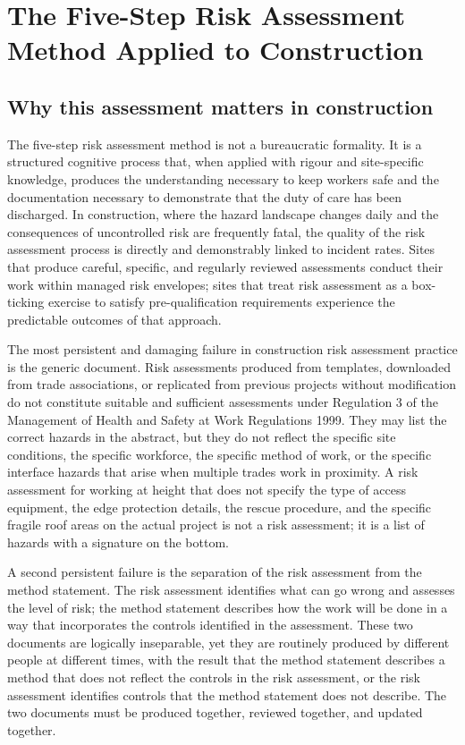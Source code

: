 \chapter{The Five-Step Risk Assessment Method Applied to Construction}
\label{chap:The Five-Step Risk Assessment Method Applied to Construction}

\section{Why this assessment matters in construction}

The five-step risk assessment method is not a bureaucratic formality. It is a structured cognitive process that, when applied with rigour and site-specific knowledge, produces the understanding necessary to keep workers safe and the documentation necessary to demonstrate that the duty of care has been discharged. In construction, where the hazard landscape changes daily and the consequences of uncontrolled risk are frequently fatal, the quality of the risk assessment process is directly and demonstrably linked to incident rates. Sites that produce careful, specific, and regularly reviewed assessments conduct their work within managed risk envelopes; sites that treat risk assessment as a box-ticking exercise to satisfy pre-qualification requirements experience the predictable outcomes of that approach.

The most persistent and damaging failure in construction risk assessment practice is the generic document. Risk assessments produced from templates, downloaded from trade associations, or replicated from previous projects without modification do not constitute suitable and sufficient assessments under Regulation 3 of the Management of Health and Safety at Work Regulations 1999. They may list the correct hazards in the abstract, but they do not reflect the specific site conditions, the specific workforce, the specific method of work, or the specific interface hazards that arise when multiple trades work in proximity. A risk assessment for working at height that does not specify the type of access equipment, the edge protection details, the rescue procedure, and the specific fragile roof areas on the actual project is not a risk assessment; it is a list of hazards with a signature on the bottom.

A second persistent failure is the separation of the risk assessment from the method statement. The risk assessment identifies what can go wrong and assesses the level of risk; the method statement describes how the work will be done in a way that incorporates the controls identified in the assessment. These two documents are logically inseparable, yet they are routinely produced by different people at different times, with the result that the method statement describes a method that does not reflect the controls in the risk assessment, or the risk assessment identifies controls that the method statement does not describe. The two documents must be produced together, reviewed together, and updated together.

